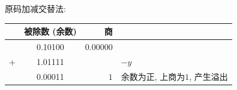 \documentclass[UTF8]{report}
\newcommand{\la}{\leftarrow}
\newcommand{\spz}{\phantom{0}}
\newenvironment{solution}{{\noindent\hskip 2em \bf 解 \quad}}{}
\begin{document}
\begin{solution}
\begin{enumerate}
        原码加减交替法:
        \begin{tabular}{cc|r|l}
            & 被除数 (余数)   & 商    & \\
           \hline
            & 0.10100  &  $0.00000 $ &   \\
           +& 1.01111  &         $ $ &  $-y$ \\
           \hline
            & 0.00011  &        $1 $ & 余数为正, 上商为$1$, 产生溢出 \\
        \end{tabular}



\end{enumerate}
\end{solution}
\end{document}
